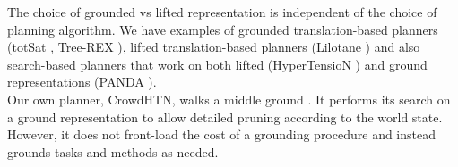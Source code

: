 The choice of grounded vs lifted representation is independent of the choice of planning algorithm. We have examples of grounded translation-based planners (totSat \cite{behnke2018totsat}, Tree-REX \cite{schreiber2019tree}), lifted translation-based planners (Lilotane \cite{schreiber2021lilotane}) and also search-based planners that work on both lifted (HyperTensioN \cite{magnaguagno2020hypertension}) and ground representations (PANDA \cite{holler2020htn}). \\
Our own planner, CrowdHTN, walks a middle ground . It performs its search on a ground representation to allow detailed pruning according to the world state. However, it does not front-load the cost of a grounding procedure and instead grounds tasks and methods as needed.
\begin{comment}
- grounding can be an expensive operation \cite{behnke2020succinct}
- grounding is an active field of research within hierarchical planning \cite{ramoul2017grounding}, \cite{behnke2020succinct}
- a discussion on the benefits and trade-offs of grounding is available in \cite{schreiber2021lilotane}
- grounded representations can have more information available for subsequent pruning, i.e. only a certain parameter combination for a reduction may be invalid but not a whole method
- lifted representations can be a lot more compact 

- efficient grounding is its own research area \cite{behnke2020succinct} \todo{cite the other comparison papers from behnke's work}


- lifted vs grounded
- Lilotane, HyperTensioN
- Panda, CrowdHTN, Tree-Rex
- lifted: more general, less pruning?
\end{comment}
